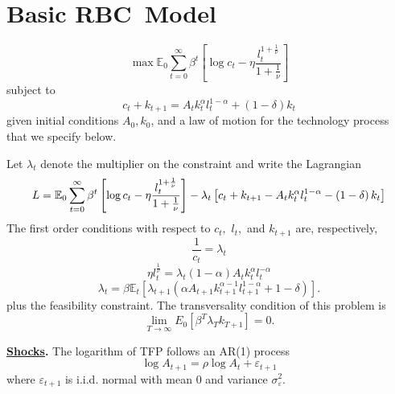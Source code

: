 \documentclass[12pt]{article}
\begin{document}
\onehalfspacing%

\section{Basic \textbf{RBC\ Model}}

\begin{equation*}
\max \mathbb{E}_{0}\sum_{t=0}^{\infty }\beta ^{t}\left[ \log c_{t}-\eta 
\frac{l_{t}^{1+\frac{1}{\nu }}}{1+\frac{1}{\nu }}\right] 
\end{equation*}%
subject to%
\begin{equation*}
c_{t}+k_{t+1}=A_{t}k_{t}^{\alpha }l_{t}^{1-\alpha }+\left( 1-\delta \right)
k_{t}
\end{equation*}%
given initial conditions $A_{0},k_{0}$, and a law of motion for the
technology process that we specify below. 

Let $\lambda _{t}$ denote the multiplier on the constraint and write the
Lagrangian%
\begin{equation*}
L=\mathbb{E}_{0}\sum_{t=0}^{\infty }\beta ^{t}\left[ \log c_{t}-\eta \frac{%
l_{t}^{1+\frac{1}{\nu }}}{1+\frac{1}{\nu }}\right] -\lambda _{t}\left[
c_{t}+k_{t+1}-A_{t}k_{t}^{\alpha }l_{t}^{1-\alpha }-\left( 1-\delta \right)
k_{t}\right]
\end{equation*}%
The first order conditions with respect to $c_{t},$ $l_{t},$ and $k_{t+1}$
are, respectively,%
\begin{equation*}
\frac{1}{c_{t}}=\lambda _{t}
\end{equation*}%
\begin{equation*}
\eta l_{t}^{\frac{1}{\nu }}=\lambda _{t}\left( 1-\alpha \right)
A_{t}k_{t}^{\alpha }l_{t}^{-\alpha }
\end{equation*}%
\begin{equation*}
\lambda _{t}=\beta \mathbb{E}_{t}\left[ \lambda _{t+1}\left( \alpha
A_{t+1}k_{t+1}^{\alpha -1}l_{t+1}^{1-\alpha }+1-\delta \right) \right] .
\end{equation*}%
plus the feasibility constraint. The transversality condition of this
problem is%
\begin{equation*}
\lim_{T\rightarrow \infty }E_{0}\left[ \beta ^{T}\lambda _{T}k_{T+1}\right]
=0.
\end{equation*}

\underline{\textbf{Shocks}}\textbf{. }The logarithm of TFP follows an AR(1)
process%
\begin{equation*}
\log A_{t+1}=\rho \log A_{t}+\varepsilon _{t+1}
\end{equation*}%
where $\varepsilon _{t+1}$ is i.i.d. normal with mean 0 and variance $\sigma
_{\varepsilon }^{2}$.
\end{document}
